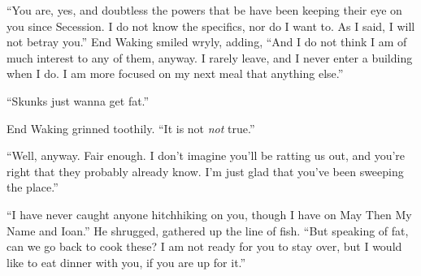 ``You are, yes, and doubtless the powers that be have been keeping their eye on you since Secession. I do not know the specifics, nor do I want to. As I said, I will not betray you.'' End Waking smiled wryly, adding, ``And I do not think I am of much interest to any of them, anyway. I rarely leave, and I never enter a building when I do. I am more focused on my next meal that anything else.''

``Skunks just wanna get fat.''

End Waking grinned toothily. ``It is not \emph{not} true.''

``Well, anyway. Fair enough. I don't imagine you'll be ratting us out, and you're right that they probably already know. I'm just glad that you've been sweeping the place.''

``I have never caught anyone hitchhiking on you, though I have on May Then My Name and Ioan.'' He shrugged, gathered up the line of fish. ``But speaking of fat, can we go back to cook these? I am not ready for you to stay over, but I would like to eat dinner with you, if you are up for it.''
